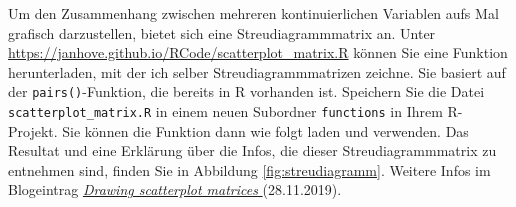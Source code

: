 Um den Zusammenhang zwischen mehreren kontinuierlichen Variablen
aufs Mal grafisch darzustellen, bietet sich eine Streudiagrammmatrix
an. Unter
\url{https://janhove.github.io/RCode/scatterplot_matrix.R}
können Sie eine Funktion herunterladen, mit der ich selber Streu\-diagramm\-matrizen
zeichne. Sie basiert auf der \texttt{pairs()}-Funktion, die bereits in R
vorhanden ist.
Speichern Sie die Datei \texttt{scatterplot\_matrix.R} in einem neuen Subordner \texttt{functions}
in Ihrem R-Projekt. Sie können die Funktion dann wie folgt laden
und verwenden. Das Resultat und eine Erklärung über die Infos,
die dieser Streudiagrammmatrix zu entnehmen sind, finden Sie
in Abbildung \ref{fig:streudiagramm}. Weitere Infos im Blogeintrag
\href{https://janhove.github.io/reporting/2019/11/28/scatterplot-matrix}{\textit{Drawing scatterplot matrices
}} (28.11.2019).
\begin{knitrout}
\color{fgcolor}\begin{kframe}
\begin{alltt}
\hlstd{(}\hlstd{(}\hlstd{,} \hlstd{))}
\end{alltt}


{\ttfamily\noindent\bfseries{}}\begin{alltt}
\end{alltt}


{\ttfamily\noindent\bfseries{}}\end{kframe}
\end{knitrout}

